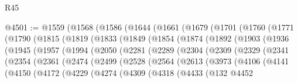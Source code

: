 \begin{lexlean}{R45}
\begin{coremodule}
@4501 := @1559
    (@1568
      (@1586
        (@1644
          (@1661
            (@1679
              (@1701
                (@1760
                  (@1771
                    (@1790
                      (@1815
                        (@1819
                          (@1833
                            (@1849
                              (@1854
                                (@1874
                                  (@1892
                                    (@1903
                                      (@1936
                                        (@1945
                                          (@1957
                                            (@1994
                                              (@2050
                                                (@2281
                                                  (@2289
                                                    (@2304
                                                      (@2309
                                                        (@2329
                                                          (@2341
                                                            (@2354
                                                              (@2361
                                                                (@2474
                                                                  (@2499
                                                                    (@2528
                                                                      (@2564
                                                                        (@2613
                                                                          (@3973
                                                                            (@4106
                                                                              (@4141
                                                                                (@4150
                                                                                  (@4172
                                                                                    (@4229
                                                                                      (@4274
                                                                                        (@4309
                                                                                          (@4318
                                                                                            (@4433
                                                                                              (@132
                                                                                                @4452

\end{coremodule}
\end{lexlean}

